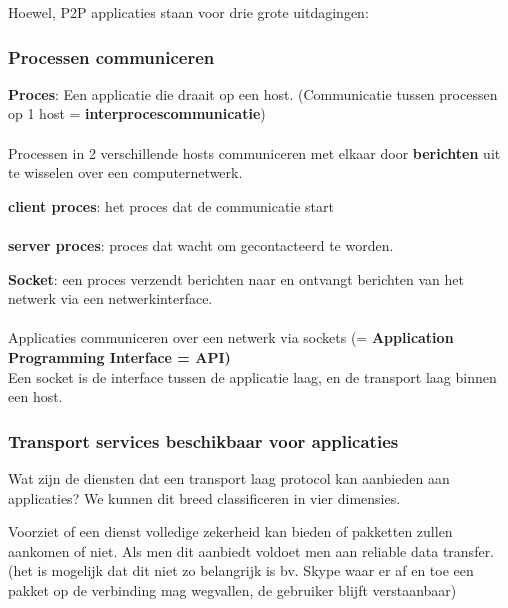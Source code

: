 \newpage \noindent Hoewel, P2P applicaties staan voor drie grote uitdagingen:

\subsubsection{Processen communiceren}

\textbf{Proces}: Een applicatie die draait op een host. (Communicatie tussen processen op 1 host = \textbf{interprocescommunicatie})
\\\\
Processen in 2 verschillende hosts communiceren met elkaar door \textbf{berichten} uit te wisselen over een computernetwerk.


\textbf{client proces}: het proces dat de communicatie start\\\\
\textbf{server proces}: proces dat wacht om gecontacteerd te worden.


\textbf{Socket}: een proces verzendt berichten naar en ontvangt berichten van het netwerk via een netwerkinterface.\\\\
Applicaties communiceren over een netwerk via sockets (= \textbf{Application Programming Interface = API)}\\

\noindent Een socket is de interface tussen de applicatie laag, en de transport laag binnen een host.

\subsubsection{Transport services beschikbaar voor applicaties}

Wat zijn de diensten dat een transport laag protocol kan aanbieden aan applicaties? We kunnen dit breed classificeren in vier dimensies.


Voorziet of een dienst volledige zekerheid kan bieden of pakketten zullen aankomen of niet. Als men dit aanbiedt voldoet men aan reliable data transfer.(het is mogelijk dat dit niet zo belangrijk is bv. Skype waar er af en toe een pakket op de verbinding mag wegvallen, de gebruiker blijft verstaanbaar)

